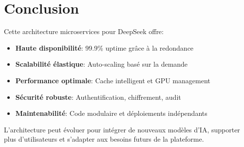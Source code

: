 \documentclass[12pt,a4paper]{article}
\begin{document}
\section{Conclusion}

Cette architecture microservices pour DeepSeek offre:

\begin{itemize}
    \item \textbf{Haute disponibilité}: 99.9\% uptime grâce à la redondance
    \item \textbf{Scalabilité élastique}: Auto-scaling basé sur la demande
    \item \textbf{Performance optimale}: Cache intelligent et GPU management
    \item \textbf{Sécurité robuste}: Authentification, chiffrement, audit
    \item \textbf{Maintenabilité}: Code modulaire et déploiements indépendants
\end{itemize}

L'architecture peut évoluer pour intégrer de nouveaux modèles d'IA, supporter plus d'utilisateurs et s'adapter aux besoins futurs de la plateforme.
\end{document}
